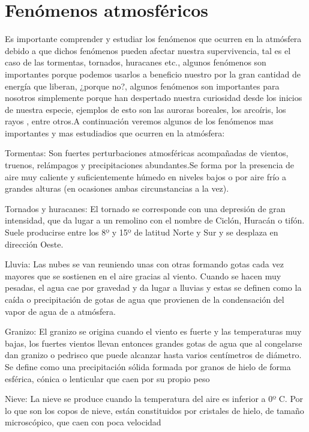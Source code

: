 \documentclass[11pt]{article}
\begin{document}
\section*{Fenómenos atmosféricos}

Es importante comprender y estudiar los fenómenos que ocurren en la atmósfera debido a que dichos fenómenos pueden afectar nuestra supervivencia, tal es el caso de las tormentas, tornados, huracanes etc., algunos fenómenos son importantes porque podemos usarlos a beneficio nuestro por la gran cantidad de energía que liberan, ¿porque no?,  algunos fenómenos son importantes para nosotros simplemente porque han despertado nuestra curiosidad desde los inicios de nuestra especie, ejemplos de esto son las auroras boreales, los arcoíris, los rayos , entre otros.A continuación veremos algunos de los fenómenos mas importantes y mas estudiadios que ocurren en la atmósfera:

Tormentas:
Son fuertes perturbaciones atmosféricas acompañadas de vientos, truenos, relámpagos y precipitaciones abundantes.Se forma por la presencia de aire muy caliente y suficientemente húmedo en niveles bajos o por aire frío a grandes alturas (en ocasiones ambas circunstancias a la vez).

Tornados y huracanes: 
El tornado se corresponde con una depresión de gran intensidad, que da lugar a un remolino con el nombre de Ciclón, Huracán o tifón. Suele producirse entre los 8º y 15º de latitud Norte y Sur y se desplaza en dirección Oeste.

Lluvia:
Las nubes se van reuniendo unas con otras formando gotas cada vez mayores que se sostienen en el aire gracias al viento. Cuando se hacen muy pesadas, el agua cae por gravedad y da lugar a lluvias y estas se definen como la caída o precipitación de gotas de agua que provienen de la condensación del vapor de agua de a atmósfera.

Granizo: El granizo se origina cuando el viento es fuerte y las temperaturas muy bajas, los fuertes vientos llevan entonces grandes gotas de agua que al congelarse dan granizo o pedrisco que puede alcanzar hasta varios centímetros de diámetro. Se define como una precipitación sólida formada por granos de hielo de forma esférica, cónica o lenticular que caen por su propio peso

Nieve:
La nieve se produce cuando la temperatura del aire es inferior a 0º C. Por lo que son los copos de nieve, están constituidos por cristales de hielo, de tamaño microscópico, que caen con poca velocidad
\end{document}
